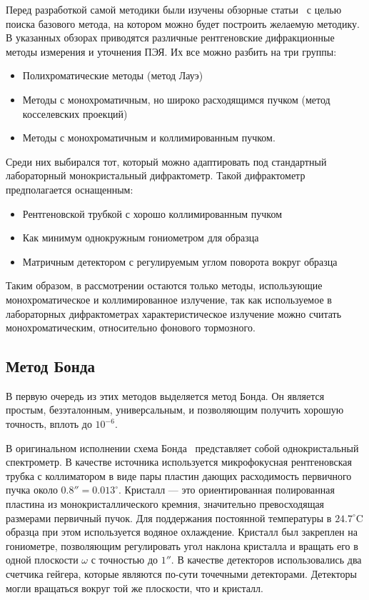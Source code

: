 \documentclass[a4paper,14pt]{extarticle}
\newcommand{\degree}{^\circ}
\newcommand{\celcius}{^\circ \text{C}}
\begin{document}
Перед разработкой самой методики были изучены обзорные статьи~\cite{Lider:2020,Galdecka:2006} с целью поиска базового метода, на котором можно будет построить желаемую методику.
В указанных обзорах приводятся различные рентгеновские дифракционные методы измерения и уточнения ПЭЯ.
Их все можно разбить на три группы:
\begin{itemize}
    \item Полихроматические методы (метод Лауэ)
    \item Методы с монохроматичным, но широко расходящимся пучком (метод косселевских проекций)
    \item Методы с монохроматичным и коллимированным пучком.
\end{itemize}
Среди них выбирался тот, который можно адаптировать под стандартный лабораторный монокристальный дифрактометр.
Такой дифрактометр предполагается оснащенным:
\begin{itemize}
    \item Рентгеновской трубкой с хорошо коллимированным пучком
    \item Как минимум однокружным гониометром для образца
    \item Матричным детектором с регулируемым углом поворота вокруг образца
\end{itemize}
Таким образом, в рассмотрении остаются только методы, использующие монохроматическое и коллимированное излучение, так как используемое в лабораторных дифрактометрах характеристическое излучение можно считать монохроматическим, относительно фонового тормозного.

\subsection{Метод Бонда}

В первую очередь из этих методов выделяется метод Бонда.
Он является простым, безэталонным, универсальным, и позволяющим получить хорошую точность, вплоть до $10^{-6}$.

В оригинальном исполнении схема Бонда~\cite{Bond:1960} представляет собой однокристальный спектрометр.
В качестве источника используется микрофокусная рентгеновская трубка с коллиматором в виде пары пластин дающих расходимость первичного пучка около $0.8'' = 0.013\degree$.
Кристалл --- это ориентированная полированная пластина из монокристаллического кремния, значительно превосходящая размерами первичный пучок.
Для поддержания постоянной температуры в $24.7\celcius$ образца при этом используется водяное охлаждение.
Кристалл был закреплен на гониометре, позволяющим регулировать угол наклона кристалла и вращать его в одной плоскости $\omega$ с точностью до $1''$.
В качестве детекторов использовались два счетчика гейгера, которые являются по-сути точечными детекторами.
Детекторы могли вращаться вокруг той же плоскости, что и кристалл.
\end{document}
